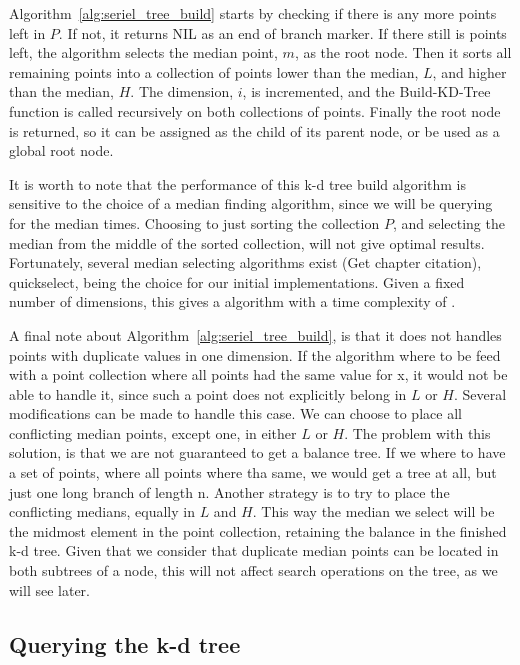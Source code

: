 Algorithm~\ref{alg:seriel_tree_build} starts by checking if there is any more points left in $P$. If not, it returns NIL as an end of branch marker. If there still is points left, the algorithm selects the median point, $m$, as the root node. Then it sorts all remaining points into a collection of points lower than the median, $L$, and higher than the median, $H$. The dimension, $i$, is incremented, and the Build-KD-Tree function is called recursively on both collections of points. Finally the root node is returned, so it can be assigned as the child of its parent node, or be used as a global root node.

It is worth to note that the performance of this k-d tree build algorithm is sensitive to the choice of a median finding algorithm, since we will be querying for the median  times. Choosing to just sorting the collection $P$, and selecting the median from the middle of the sorted collection, will not give optimal results. Fortunately, several  median selecting algorithms exist\cite{Cormen:2001} (Get chapter citation), quickselect, being the choice for our initial implementations. Given a fixed number of dimensions, this gives a algorithm with a time complexity of \cite{Friedman:1977}.

A final note about Algorithm~\ref{alg:seriel_tree_build}, is that it does not handles points with duplicate values in one dimension. If the algorithm where to be feed with a point collection where all points had the same value for x, it would not be able to handle it, since such a point does not explicitly belong in $L$ or $H$. Several modifications can be made to handle this case. We can choose to place all conflicting median points, except one, in either $L$ or $H$. The problem with this solution, is that we are not guaranteed to get a balance tree. If we where to have a set of points, where all points where tha same, we would get a tree at all, but just one long branch of length n. Another strategy is to try to place the conflicting medians, equally in $L$ and $H$. This way the median we select will be the midmost element in the point collection, retaining the balance in the finished k-d tree. Given that we consider that duplicate median points can be located in both subtrees of a node, this will not affect search operations on the tree, as we will see later.

\subsection{Querying the k-d tree}  %
\label{sub:querying_the_k_d_tree} 

